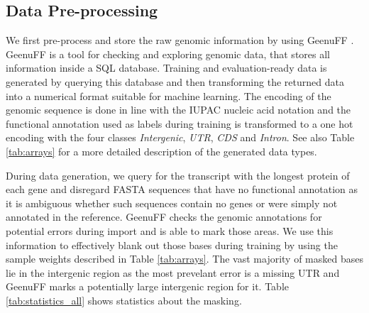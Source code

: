 \documentclass{bioinfo}
\begin{document}
\begin{methods}
\subsection{Data Pre-processing}
We first pre-process and store the raw genomic information by using GeenuFF 
\citep{denton2019}. GeenuFF is a tool for checking and exploring genomic data, that 
stores all information inside a SQL database. Training and evaluation-ready data is 
generated by querying this database and then transforming the returned data into a 
numerical format suitable for machine learning. The encoding of the genomic sequence 
is done in line with the IUPAC nucleic acid notation and the functional annotation 
used as labels during training is transformed to a one hot encoding with the four 
classes {\it Intergenic}, {\it UTR}, {\it CDS} and {\it Intron}. See also Table 
\ref{tab:arrays} for a more detailed description of the generated data types.

\begin{table}[!htb]
\label{tab:arrays}
\end{table}

During data generation, we query for the transcript with the longest protein of each gene and 
disregard FASTA sequences that have no functional annotation as it is ambiguous
whether such sequences contain no genes or were simply not annotated in the reference. GeenuFF checks the 
genomic annotations for potential errors during import and is able to mark those 
areas. We use this information to effectively blank out those bases during training 
by using the sample weights described in Table \ref{tab:arrays}. The vast majority 
of masked bases lie in the intergenic region as the most prevelant error is a 
missing UTR and GeenuFF marks a potentially large intergenic region for it. Table 
\ref{tab:statistics_all} shows statistics about the masking. 


\end{methods}
\end{document}
